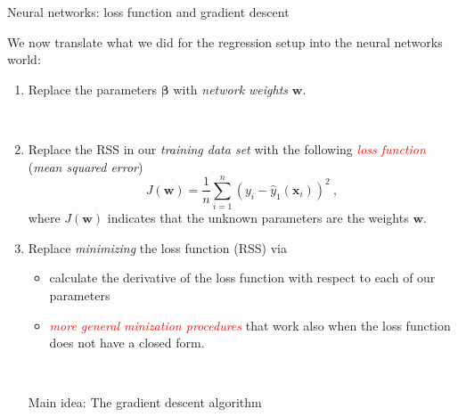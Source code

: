 \documentclass[10pt,ignorenonframetext,]{beamer}
\providecommand{\tightlist}{%
  \setlength{\itemsep}{0pt}\setlength{\parskip}{0pt}}
\begin{document}
\begin{frame}

\begin{block}{Neural networks: loss function and gradient descent}

\vspace{4mm}

We now translate what we did for the regression setup into the neural
networks world: \vspace{2mm}

\begin{enumerate}
\tightlist
\item
  Replace the parameters \(\boldsymbol\beta\) with \emph{network
  weights} \(\boldsymbol w\).
\end{enumerate}

\(~\)

\begin{enumerate}
\setcounter{enumi}{1}
\tightlist
\item
  Replace the RSS in our \emph{training data set} with the following
  \emph{\textcolor{red}{loss function}} (\emph{mean squared error})
  \[ J({\boldsymbol w})=\frac{1}{n}\sum_{i=1}^n (y_i-{\hat{y}_1({\boldsymbol x}_i)})^2 \ ,\]
  where \(J({\boldsymbol w})\) indicates that the unknown parameters are
  the weights \({\boldsymbol w}\).
\end{enumerate}

\end{block}

\end{frame}

\begin{frame}

\begin{enumerate}
\setcounter{enumi}{2}
\tightlist
\item
  Replace \emph{minimizing} the loss function (RSS) via \vspace{2mm}

  \begin{itemize}
  \tightlist
  \item
    calculate the derivative of the loss function with respect to each
    of our parameters
  \item
    \emph{\textcolor{red}{more general minization procedures}} that work
    also when the loss function does not have a closed form.
  \end{itemize}

  \(~\)

  Main idea: The gradient descent algorithm
\end{enumerate}

\end{frame}
\end{document}
